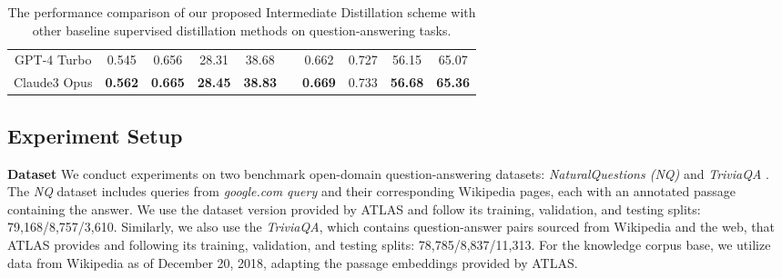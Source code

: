 {\begin{table*}[t]
{{\begin{tabular}{*{10}{c}}
      GPT-4 Turbo & 0.545 & 0.656 & 28.31 & 38.68 & & 0.662 & 0.727 & 56.15 & 65.07 \\
      Claude3 Opus & \textbf{0.562} & \textbf{0.665} & \textbf{28.45} & \textbf{38.83} & & \textbf{0.669} & 0.733 & \textbf{56.68} & \textbf{65.36} \\
      \bottomrule
    \end{tabular}
    }}
    \caption{The performance comparison of our proposed Intermediate Distillation scheme with other baseline supervised distillation methods on question-answering tasks.}
    \label{tab:tab02}
    \vspace{-5mm}  %
\end{table*}}
\subsection{Experiment Setup}
\textbf{Dataset} We conduct experiments on two benchmark open-domain question-answering datasets: \textit{NaturalQuestions (NQ)} \cite{kwiatkowski-etal-2019-natural} and \textit{TriviaQA} \cite{joshi-etal-2017-triviaqa}.
The \textit{NQ} dataset includes queries from \textit{google.com query} and their corresponding Wikipedia pages, each with an annotated passage containing the answer.
We use the dataset version provided by ATLAS \cite{izacard2023atlas} and follow its training, validation, and testing splits: 79,168/8,757/3,610. 
Similarly, we also use the \textit{TriviaQA}, which contains question-answer pairs sourced from Wikipedia and the web, that ATLAS provides and following its training, validation, and testing splits: 78,785/8,837/11,313.
For the knowledge corpus base, we utilize data from
Wikipedia as of December 20, 2018, adapting the passage embeddings provided by ATLAS.

